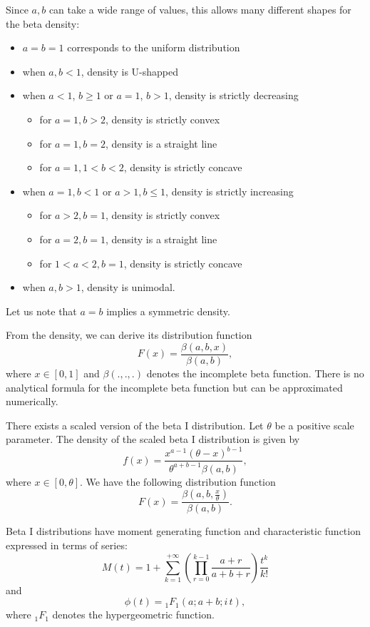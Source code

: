 Since $a,b$ can take a wide range of values, this allows many different shapes for the beta density:
\begin{itemize}
\item $a=b=1$ corresponds to the uniform distribution
\item when $a,b<1$, density is U-shapped
\item when $a<1$, $b\geq 1$ or $a=1$, $b>1$, density is strictly decreasing
	\begin{itemize}
	\item for $a=1,b>2$, density is strictly convex
	\item for $a=1, b=2$, density is a straight line
	\item for $a=1, 1<b<2$, density is strictly concave
	\end{itemize}
\item when $a=1, b<1$ or $a>1, b\leq 1$, density is strictly increasing 	\begin{itemize}
	\item for $a>2,b=1$, density is strictly convex
	\item for $a=2, b=1$, density is a straight line
	\item for $1<a<2, b=1$, density is strictly concave
	\end{itemize}
\item when $a,b>1$, density is unimodal.
\end{itemize}
Let us note that $a=b$ implies a symmetric density.

From the density, we can derive its distribution function
$$
F(x) = \frac{\beta(a,b,x)}{\beta(a,b)},
$$
where $x\in [0,1]$ and $\beta(.,.,.)$ denotes the incomplete beta function. There is no analytical formula for the incomplete beta function but can be approximated numerically.

There exists a scaled version of the beta I distribution. Let $\theta$ be a positive scale parameter. The density of the scaled beta I distribution is given by
$$
f(x) = \frac{x^{a-1} (\theta-x)^{b-1} }{\theta^{a+b-1}\beta(a,b)},
$$
where $x\in [0,\theta]$. We have the following distribution function
$$
F(x) = \frac{\beta(a,b,\frac{x}{\theta})}{\beta(a,b)}.
$$

Beta I distributions have moment generating function and characteristic function expressed in terms of series:
$$
M(t)=1  +\sum_{k=1}^{+\infty} \left( \prod_{r=0}^{k-1} \frac{a+r}{a+b+r} \right) \frac{t^k}{k!}
$$
and
$$
\phi(t) = {}_1F_1(a; a+b; i\,t),
$$
where ${}_1F_1$ denotes the hypergeometric function.

